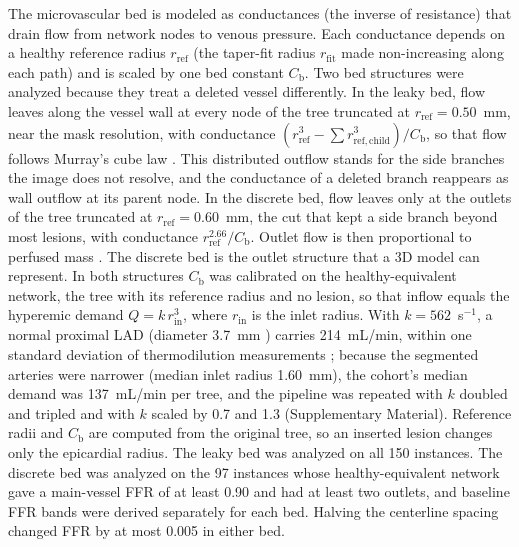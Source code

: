 \documentclass[journal,twoside,web]{ieeecolor}
\begin{document}
The microvascular bed is modeled as conductances (the inverse of resistance) that drain flow from network nodes to
venous pressure. Each conductance depends on a healthy reference radius $r_\mathrm{ref}$ (the taper-fit radius
$r_\mathrm{fit}$ made non-increasing along each path) and is scaled by one bed constant $C_\mathrm{b}$. Two bed structures were analyzed because they treat a deleted vessel differently. In the leaky
bed, flow leaves along the vessel wall at every node of the tree truncated at $r_\mathrm{ref} = 0.50$~mm, near the mask resolution, with
conductance $(r_\mathrm{ref}^3 - \sum r_{\mathrm{ref},\mathrm{child}}^3)/C_\mathrm{b}$, so that flow follows Murray's cube law
\cite{murray1926}. This distributed outflow stands for the side branches the image does not resolve, and the
conductance of a deleted branch reappears as wall outflow at its parent node. In the discrete bed, flow leaves only
at the outlets of the tree truncated at $r_\mathrm{ref} = 0.60$~mm, the cut that kept a side branch beyond most lesions, with conductance $r_\mathrm{ref}^{2.66}/C_\mathrm{b}$.
Outlet flow is then proportional to perfused mass \cite{choy2008}. The discrete bed is the outlet structure that a 3D model can
represent. In both structures $C_\mathrm{b}$ was calibrated on the healthy-equivalent network, the tree with its reference
radius and no lesion, so that inflow equals the hyperemic demand $Q = k\,r_\mathrm{in}^3$, where $r_\mathrm{in}$ is
the inlet radius. With $k = 562$~s$^{-1}$, a normal proximal LAD (diameter 3.7~mm \cite{dodge1992}) carries
214~mL/min, within one standard deviation of thermodilution measurements \cite{fournier2021}; because the segmented
arteries were narrower (median inlet radius 1.60~mm), the cohort's median demand was 137~mL/min per tree, and the
pipeline was repeated with $k$ doubled and tripled and with $k$ scaled by 0.7 and 1.3 (Supplementary Material). Reference radii and $C_\mathrm{b}$ are computed from the original tree, so an inserted lesion changes
only the epicardial radius. The leaky bed was analyzed on all 150 instances. The discrete bed was analyzed on the
97 instances whose healthy-equivalent network gave a main-vessel FFR of at least 0.90 and had at least two outlets,
and baseline FFR bands were derived separately for each bed. Halving the centerline spacing changed FFR by at most
0.005 in either bed.
\end{document}
